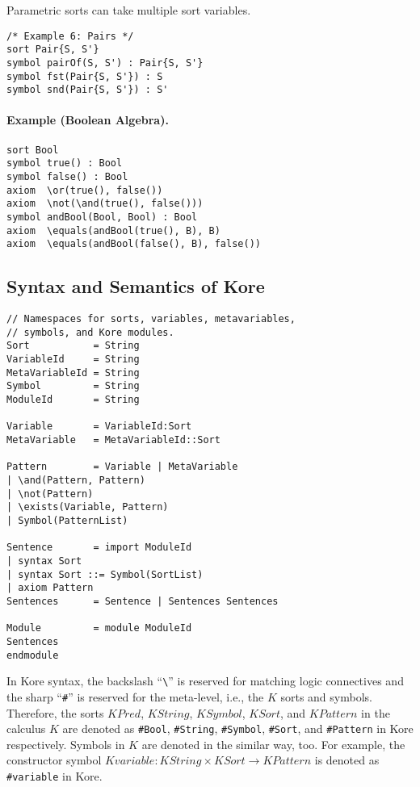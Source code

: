 \documentclass[UTF8,11pt]{article}
\theoremstyle{plain}
\theoremstyle{definition}
\theoremstyle{remark}
\newcommand{\KPred}{\mathit{KPred}}
\newcommand{\KString}{\mathit{KString}}
\newcommand{\KSort}{\mathit{KSort}}
\newcommand{\KSymbol}{\mathit{KSymbol}}
\newcommand{\KPattern}{\mathit{KPattern}}
\newcommand{\Kvariable}{\mathit{Kvariable}}
\begin{document}
Parametric sorts can take multiple sort variables.
\begin{Verbatim}[fontsize=\small]
/* Example 6: Pairs */
sort Pair{S, S'}
symbol pairOf(S, S') : Pair{S, S'}
symbol fst(Pair{S, S'}) : S
symbol snd(Pair{S, S'}) : S'  
\end{Verbatim}

\paragraph{Example (Boolean Algebra).}
\begin{Verbatim}[fontsize=\small]
sort Bool
symbol true() : Bool
symbol false() : Bool
axiom  \or(true(), false())
axiom  \not(\and(true(), false()))
symbol andBool(Bool, Bool) : Bool
axiom  \equals(andBool(true(), B), B)
axiom  \equals(andBool(false(), B), false())
\end{Verbatim}


\subsection{Syntax and Semantics of Kore}
\label{sec:syntax-of-kore}

\begin{Verbatim}[fontsize=\small]
// Namespaces for sorts, variables, metavariables,
// symbols, and Kore modules.
Sort           = String
VariableId     = String
MetaVariableId = String
Symbol         = String
ModuleId       = String

Variable       = VariableId:Sort
MetaVariable   = MetaVariableId::Sort

Pattern        = Variable | MetaVariable
| \and(Pattern, Pattern)
| \not(Pattern)
| \exists(Variable, Pattern)
| Symbol(PatternList)

Sentence       = import ModuleId
| syntax Sort
| syntax Sort ::= Symbol(SortList)
| axiom Pattern
Sentences      = Sentence | Sentences Sentences

Module         = module ModuleId
Sentences
endmodule
\end{Verbatim}

In Kore syntax, the backslash ``\verb|\|'' is reserved for matching logic 
connectives and the sharp ``\verb|#|'' is reserved for the meta-level, i.e., 
the $K$ sorts and symbols. 
Therefore, the sorts $\KPred$, $\KString$, $\KSymbol$, $\KSort$, and 
$\KPattern$ in the calculus $K$ are denoted as \verb|#Bool|, \verb|#String|, 
\verb|#Symbol|, \verb|#Sort|, and \verb|#Pattern| in Kore respectively.
Symbols in $K$ are denoted in the similar way, too. 
For example, the constructor symbol $\Kvariable \colon \KString \times \KSort 
\to \KPattern$ is denoted as \verb|#variable| in Kore. 
\end{document}
